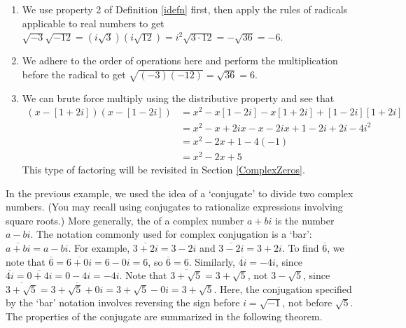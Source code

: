 {\begin{enumerate}
\item  We use property 2 of Definition \ref{idefn} first, then apply the rules of radicals applicable to real numbers to get $\sqrt{-3} \sqrt{-12} = \left(i \sqrt{3}\right) \left(i \sqrt{12}\right) = i^2 \sqrt{3\cdot 12} = -\sqrt{36} = -6$.

\item  We adhere to the order of operations here and perform the multiplication before the radical to get  $\sqrt{(-3)(-12)} = \sqrt{36} = 6$. 

\item  We can brute force multiply using the distributive property and see that 
\begin{align*}
(x-[1+2i])(x-[1-2i]) & =  x^2 -x[1-2i]-x[1+2i]+[1-2i][1+2i]  \tag*{F.O.I.L.}\\								 & =  x^2-x+2ix-x-2ix+1-2i+2i-4i^2  \tag*{Distribute} \\								 & =  x^2-2x + 1-4(-1) \tag*{Gather like terms}\\										 & =  x^2 -2x +5  \tag*{$i^2=-1$}
\end{align*}
This type of factoring will be revisited in Section \ref{ComplexZeros}. 

\end{enumerate}
}

\medskip

In the previous example, we used the idea of a `conjugate' to divide two complex numbers. (You may recall using conjugates to rationalize expressions involving square roots.)  More generally, the  of a complex number $a+bi$ is the number $a-bi$.  The notation commonly used for complex conjugation is a `bar':  $\overline{a+bi} = a-bi$. For example, $\overline{3+2i} = 3-2i$ and $\overline{3-2i} = 3+2i$. To find $\overline{6}$, we note that $\overline{6} = \overline{6+0i}= 6 - 0i = 6$, so $\overline{6} = 6$. Similarly, $\overline{4i} = -4i$, since $\overline{4i} = \overline{0 + 4i} = 0 - 4i =  -4i$.  Note that $\overline{3+\sqrt{5}} = 3 + \sqrt{5}$, not $3 - \sqrt{5}$, since  $\overline{3+\sqrt{5}} = \overline{3+\sqrt{5} + 0i} = 3+\sqrt{5}  - 0i = 3+\sqrt{5}$. Here, the conjugation specified by the `bar' notation involves reversing the sign before $i = \sqrt{-1}$, not before  $\sqrt{5}$.  The properties of the conjugate are summarized in the following theorem.

\medskip

